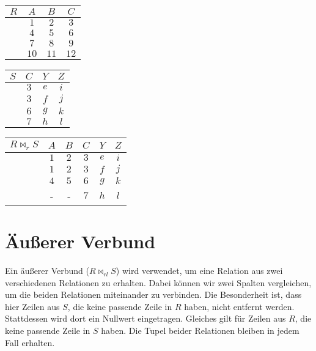 \documentclass[12pt,a4paper,notitlepage,leqno]{article}
\begin{document}
\begin{center}
    \begin{tabular}{c|ccc}
        $R$ & $A$ & $B$ & $C$ \\\hline
         & $1$ & $2$ & $3$ \\
         & $4$ & $5$ & $6$ \\
         & $7$ & $8$ & $9$ \\
         & $10$ & $11$ & $12$
    \end{tabular}
    \hspace{1cm}
    \begin{tabular}{c|ccc}
        $S$ & $C$ & $Y$ & $Z$ \\\hline
         & $3$ & $e$ & $i$ \\
         & $3$ & $f$ & $j$ \\
         & $6$ & $g$ & $k$ \\
         & $7$ & $h$ & $l$
    \end{tabular}
    \hspace{1cm}
    \begin{tabular}{c|ccccc}
        $R \bowtie_r S$ & $A$ & $B$ & $C$ & $Y$ & $Z$ \\\hline
         & $1$ & $2$ & $3$ & $e$ & $i$ \\
         & $1$ & $2$ & $3$ & $f$ & $j$ \\
         & $4$ & $5$ & $6$ & $g$ & $k$\\
         & - & - &$7$ & $h$ & $l$
    \end{tabular}
\end{center}

\section*{Äußerer Verbund}

Ein äußerer Verbund ($R \bowtie_{rl} S$) wird verwendet, um eine Relation aus zwei verschiedenen Relationen zu erhalten. Dabei können wir zwei Spalten vergleichen, um die beiden Relationen miteinander zu verbinden. Die Besonderheit ist, dass hier Zeilen aus $S$, die keine passende Zeile in $R$ haben, nicht entfernt werden. Stattdessen wird dort ein Nullwert eingetragen. Gleiches gilt für Zeilen aus $R$, die keine passende Zeile in $S$ haben. Die Tupel beider Relationen bleiben in jedem Fall erhalten.
\end{document}
